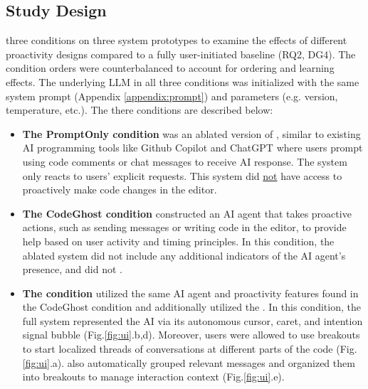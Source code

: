 \subsection{Study Design}
\label{Evaluation:study-design}
 three conditions on three system prototypes to examine the effects of different proactivity designs compared to a fully user-initiated baseline (RQ2, DG4).
The condition orders were counterbalanced to account for ordering and learning effects.
The underlying LLM in all three conditions was initialized with the same system prompt (Appendix \ref{appendix:prompt}) and parameters (e.g. version, temperature, etc.).
The there conditions are described below:
\begin{itemize}
    \item \textbf{The PromptOnly condition} was an ablated version of \sys{}, similar to existing AI programming tools like Github Copilot \cite{githubcopilot} and ChatGPT \cite{chatgpt} where users prompt using code comments or chat messages to receive AI response. The system only reacts to users' explicit requests. This system did \underline{not} have access to proactively make code changes in the editor.
    \item \textbf{The CodeGhost condition} constructed an AI agent that takes proactive actions, such as sending messages or writing code in the editor, to provide help based on user activity and timing principles. In this condition, the ablated system did not include any additional indicators of the AI agent's presence, and did not .
    \item \textbf{The \sys{} condition} utilized the same AI agent and proactivity features found in the CodeGhost condition and additionally utilized the . In this condition, the full system represented the AI via its autonomous cursor, caret, and intention signal bubble (Fig.\ref{fig:ui}.b,d). Moreover, users were allowed to use breakouts to start localized threads of conversations at different parts of the code (Fig.\ref{fig:ui}.a). \sys{} also automatically grouped relevant messages and organized them into breakouts to manage interaction context (Fig.\ref{fig:ui}.e).
\end{itemize}


